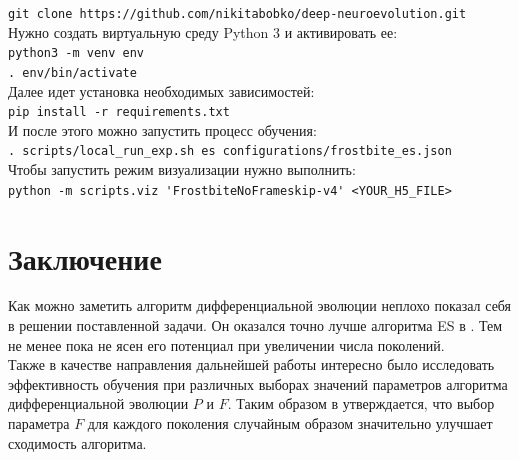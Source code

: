 \documentclass[12pt]{article}
\begin{document}
    \verb!git clone https://github.com/nikitabobko/deep-neuroevolution.git! \\

    Нужно создать виртуальную среду Python 3 и активировать ее: \\

    \verb!python3 -m venv env! \\
    \verb!. env/bin/activate! \\

    Далее идет установка необходимых зависимостей: \\

    \verb!pip install -r requirements.txt! \\

    И после этого можно запустить процесс обучения: \\

    \verb!. scripts/local_run_exp.sh es configurations/frostbite_es.json! \\

    Чтобы запустить режим визуализации нужно выполнить: \\

    \verb!python -m scripts.viz 'FrostbiteNoFrameskip-v4' <YOUR_H5_FILE>!

\section{Заключение}
    Как можно заметить алгоритм дифференциальной эволюции неплохо показал себя в решении поставленной задачи. Он оказался точно лучше алгоритма ES в \cite{uber}. Тем не менее пока не ясен его потенциал при увеличении числа поколений. \\

    Также в качестве направления дальнейшей работы интересно было исследовать эффективность обучения при различных выборах значений параметров алгоритма дифференциальной эволюции $P$ и $F$. Таким образом в \cite{DE} утверждается, что выбор параметра $F$ для каждого поколения случайным образом значительно улучшает сходимость алгоритма.
\end{document}
